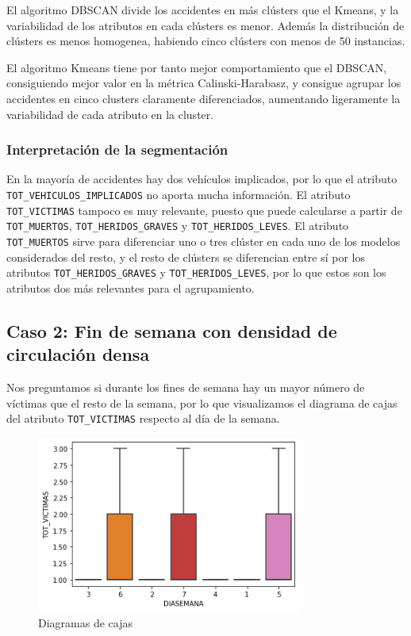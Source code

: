 \documentclass[a4]{article}
\begin{document}
El algoritmo DBSCAN divide los accidentes en más clústers que el Kmeans, y la variabilidad de los atributos en cada clústers es menor. Además la distribución de clústers es menos homogenea, habiendo cinco clústers con menos de 50 instancias.

El algoritmo Kmeans tiene por tanto mejor comportamiento que el DBSCAN, consiguiendo mejor valor en la métrica Calinski-Harabasz, y consigue agrupar los accidentes en cinco clusters claramente diferenciados, aumentando ligeramente la variabilidad de cada atributo en la cluster.

\subsubsection{Interpretación de la segmentación}

En la mayoría de accidentes hay dos vehículos implicados, por lo que el atributo \texttt{TOT\_VEHICULOS\_IMPLICADOS} no aporta mucha información. El atributo \texttt{TOT\_VICTIMAS} tampoco es muy relevante, puesto que puede calcularse a partir de \texttt{TOT\_MUERTOS}, \texttt{TOT\_HERIDOS\_GRAVES} y \texttt{TOT\_HERIDOS\_LEVES}. El atributo \texttt{TOT\_MUERTOS} sirve para diferenciar uno o tres clúster en cada uno de los modelos considerados del resto, y el resto de clústers se diferencian entre sí por los atributos \texttt{TOT\_HERIDOS\_GRAVES} y \texttt{TOT\_HERIDOS\_LEVES}, por lo que estos son los atributos dos más relevantes para el agrupamiento.

\newpage
\subsection{Caso 2: Fin de semana con densidad de circulación densa}

Nos preguntamos si durante los fines de semana hay un mayor número de víctimas que el resto de la semana, por lo que visualizamos el diagrama de cajas del atributo \texttt{TOT\_VICTIMAS} respecto al día de la semana.

\begin{figure}[H]
  \centering
  \caption{Diagramas de cajas}
  \includegraphics[width=87mm]{imagenes/c2_selec_atr}
\end{figure}
\end{document}
